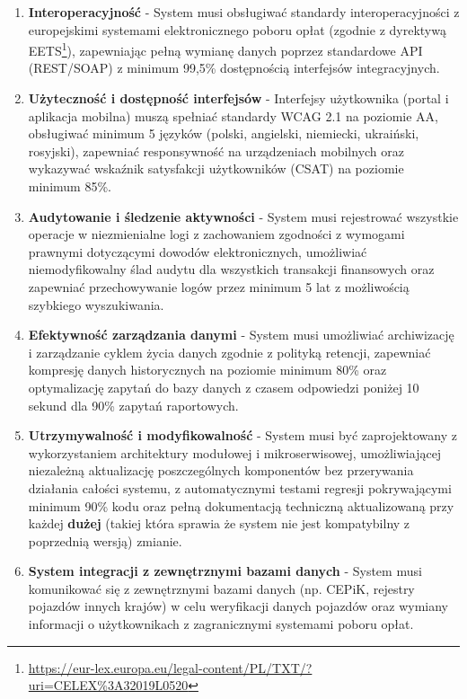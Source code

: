 \begin{enumerate}
    \item \textbf{Interoperacyjność} - System musi obsługiwać standardy interoperacyjności z europejskimi systemami elektronicznego poboru opłat (zgodnie z dyrektywą EETS\footnote{\url{https://eur-lex.europa.eu/legal-content/PL/TXT/?uri=CELEX\%3A32019L0520}}), zapewniając pełną wymianę danych poprzez standardowe API (REST/SOAP) z minimum 99,5\% dostępnością interfejsów integracyjnych.

    \item \textbf{Użyteczność i dostępność interfejsów} - Interfejsy użytkownika (portal i aplikacja mobilna) muszą spełniać standardy WCAG 2.1 na poziomie AA, obsługiwać minimum 5 języków (polski, angielski, niemiecki, ukraiński, rosyjski), zapewniać responsywność na urządzeniach mobilnych oraz wykazywać wskaźnik satysfakcji użytkowników (CSAT) na poziomie minimum 85\%.

    \item \textbf{Audytowanie i śledzenie aktywności} - System musi rejestrować wszystkie operacje w niezmienialne logi z zachowaniem zgodności z wymogami prawnymi dotyczącymi dowodów elektronicznych, umożliwiać niemodyfikowalny ślad audytu dla wszystkich transakcji finansowych oraz zapewniać przechowywanie logów przez minimum 5 lat z możliwością szybkiego wyszukiwania.

    \item \textbf{Efektywność zarządzania danymi} - System musi umożliwiać archiwizację i zarządzanie cyklem życia danych zgodnie z polityką retencji, zapewniać kompresję danych historycznych na poziomie minimum 80\% oraz optymalizację zapytań do bazy danych z czasem odpowiedzi poniżej 10 sekund dla 90\% zapytań raportowych.

    \item \textbf{Utrzymywalność i modyfikowalność} - System musi być zaprojektowany z wykorzystaniem architektury modułowej i mikroserwisowej, umożliwiającej niezależną aktualizację poszczególnych komponentów bez przerywania działania całości systemu, z automatycznymi testami regresji pokrywającymi minimum 90\% kodu oraz pełną dokumentacją techniczną aktualizowaną przy każdej \textbf{dużej} (takiej która sprawia że system nie jest kompatybilny z poprzednią wersją) zmianie.

    \item \textbf{System integracji z zewnętrznymi bazami danych} - System musi komunikować się z zewnętrznymi bazami danych (np. CEPiK, rejestry pojazdów innych krajów) w celu weryfikacji danych pojazdów oraz wymiany informacji o użytkownikach z zagranicznymi systemami poboru opłat.


\end{enumerate}
